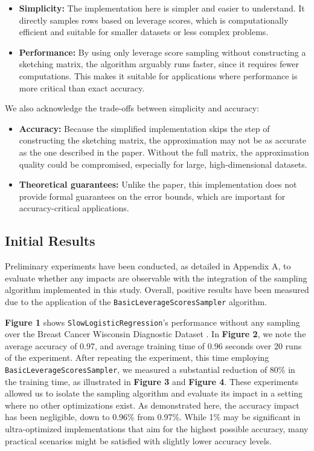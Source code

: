 \documentclass{article}
\theoremstyle{plain}
\theoremstyle{definition}
\theoremstyle{remark}
\begin{document}
\begin{itemize}

\item \textbf{Simplicity:} The implementation here is simpler and easier to understand. It directly samples rows based on leverage scores, which is computationally efficient and suitable for smaller datasets or less complex problems.

\item \textbf{Performance:} By using only leverage score sampling without constructing a sketching matrix, the algorithm arguably runs faster, since it requires fewer computations. This makes it suitable for applications where performance is more critical than exact accuracy.

\end{itemize}

We also acknowledge the trade-offs between simplicity and accuracy:

\begin{itemize}

\item \textbf{Accuracy:} Because the simplified implementation skips the step of constructing the sketching matrix, the approximation may not be as accurate as the one described in the paper. Without the full matrix, the approximation quality could be compromised, especially for large, high-dimensional datasets.

\item \textbf{Theoretical guarantees:} Unlike the paper, this implementation does not provide formal guarantees on the error bounds, which are important for accuracy-critical applications.

\end{itemize}


\subsection{Initial Results}

Preliminary experiments have been conducted, as detailed in Appendix A, to evaluate whether any impacts are observable with the integration of the sampling algorithm implemented in this study. Overall, positive results have been measured due to the application of the \texttt{BasicLeverageScoresSampler} algorithm.

\textbf{Figure 1} shows \texttt{SlowLogisticRegression}'s performance without any sampling over the Breast Cancer Wisconsin Diagnostic Dataset \cite{breastcancer}. In \textbf{Figure 2}, we note the average accuracy of 0.97, and average training time of 0.96 seconds over 20 runs of the experiment. After repeating the experiment, this time employing \texttt{BasicLeverageScoresSampler}, we measured a substantial reduction of 80\% in the training time, as illustrated in \textbf{Figure 3} and \textbf{Figure 4}. These experiments allowed us to isolate the sampling algorithm and evaluate its impact in a setting where no other optimizations exist. As demonstrated here, the accuracy impact has been negligible, down to 0.96\% from 0.97\%. While 1\% may be significant in ultra-optimized implementations that aim for the highest possible accuracy, many practical scenarios might be satisfied with slightly lower accuracy levels.
\end{document}
